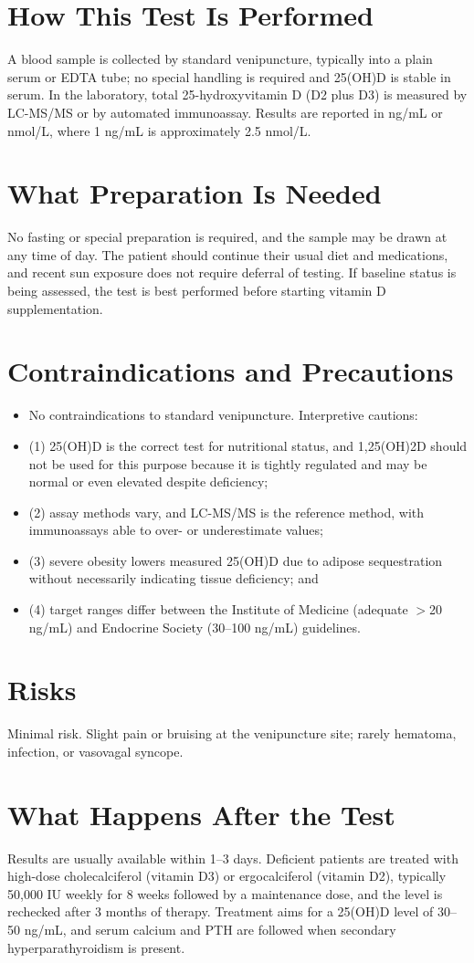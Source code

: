 \section*{How This Test Is Performed}
A blood sample is collected by standard venipuncture, typically into a plain serum or EDTA tube; no special handling is required and 25(OH)D is stable in serum. In the laboratory, total 25-hydroxyvitamin D (D2 plus D3) is measured by LC-MS/MS or by automated immunoassay. Results are reported in ng/mL or nmol/L, where 1 ng/mL is approximately 2.5 nmol/L.
\section*{What Preparation Is Needed}
No fasting or special preparation is required, and the sample may be drawn at any time of day. The patient should continue their usual diet and medications, and recent sun exposure does not require deferral of testing. If baseline status is being assessed, the test is best performed before starting vitamin D supplementation.
\section*{Contraindications and Precautions}
\begin{itemize}
  \item No contraindications to standard venipuncture. Interpretive cautions:
  \item (1) 25(OH)D is the correct test for nutritional status, and 1,25(OH)2D should not be used for this purpose because it is tightly regulated and may be normal or even elevated despite deficiency;
  \item (2) assay methods vary, and LC-MS/MS is the reference method, with immunoassays able to over- or underestimate values;
  \item (3) severe obesity lowers measured 25(OH)D due to adipose sequestration without necessarily indicating tissue deficiency; and
  \item (4) target ranges differ between the Institute of Medicine (adequate $>$20 ng/mL) and Endocrine Society (30--100 ng/mL) guidelines.
\end{itemize}
\section*{Risks}
Minimal risk. Slight pain or bruising at the venipuncture site; rarely hematoma, infection, or vasovagal syncope.
\section*{What Happens After the Test}
Results are usually available within 1--3 days. Deficient patients are treated with high-dose cholecalciferol (vitamin D3) or ergocalciferol (vitamin D2), typically 50,000 IU weekly for 8 weeks followed by a maintenance dose, and the level is rechecked after 3 months of therapy. Treatment aims for a 25(OH)D level of 30--50 ng/mL, and serum calcium and PTH are followed when secondary hyperparathyroidism is present.
